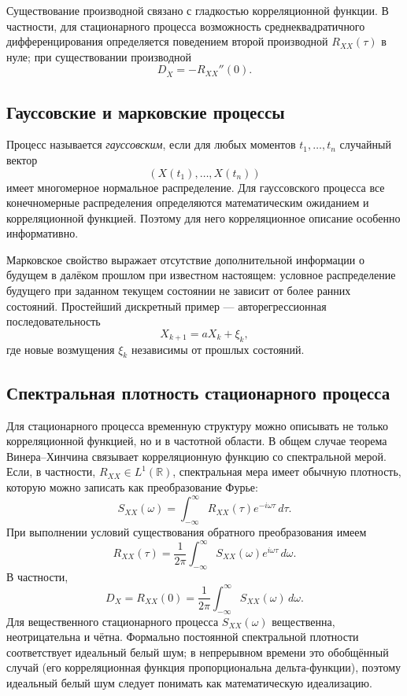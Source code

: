 Существование производной связано с гладкостью корреляционной функции. В
частности, для стационарного процесса возможность среднеквадратичного
дифференцирования определяется поведением второй производной
$R_{XX}(\tau)$ в нуле; при существовании производной
\[
    D_{\dot X}=-R_{XX}''(0).
\]

\subsection{Гауссовские и марковские процессы}

Процесс называется \emph{гауссовским}, если для любых моментов
$t_1,\ldots,t_n$ случайный вектор
\[
    (X(t_1),\ldots,X(t_n))
\]
имеет многомерное нормальное распределение. Для гауссовского процесса все
конечномерные распределения определяются математическим ожиданием и
корреляционной функцией. Поэтому для него корреляционное описание особенно
информативно.

Марковское свойство выражает отсутствие дополнительной информации о будущем в
далёком прошлом при известном настоящем: условное распределение будущего при
заданном текущем состоянии не зависит от более ранних состояний. Простейший
дискретный пример --- авторегрессионная последовательность
\[
    X_{k+1}=aX_k+\xi_k,
\]
где новые возмущения $\xi_k$ независимы от прошлых состояний.

\subsection{Спектральная плотность стационарного процесса}

Для стационарного процесса временную структуру можно описывать не только
корреляционной функцией, но и в частотной области. В общем случае теорема
Винера--Хинчина связывает корреляционную функцию со спектральной мерой.
Если, в частности, $R_{XX}\in L^1(\mathbb R)$, спектральная мера имеет обычную
плотность, которую можно записать как преобразование Фурье:
\[
    S_{XX}(\omega)
    =\int_{-\infty}^{\infty}R_{XX}(\tau)e^{-i\omega\tau}\,d\tau.
\]
При выполнении условий существования обратного преобразования имеем
\[
    R_{XX}(\tau)
    =\frac{1}{2\pi}\int_{-\infty}^{\infty}
      S_{XX}(\omega)e^{i\omega\tau}\,d\omega.
\]
В частности,
\[
    D_X=R_{XX}(0)
    =\frac{1}{2\pi}\int_{-\infty}^{\infty}S_{XX}(\omega)\,d\omega.
\]
Для вещественного стационарного процесса $S_{XX}(\omega)$ вещественна,
неотрицательна и чётна. Формально постоянной спектральной плотности соответствует
идеальный белый шум; в непрерывном времени это обобщённый случай (его
корреляционная функция пропорциональна дельта-функции), поэтому идеальный белый
шум следует понимать как математическую идеализацию.

